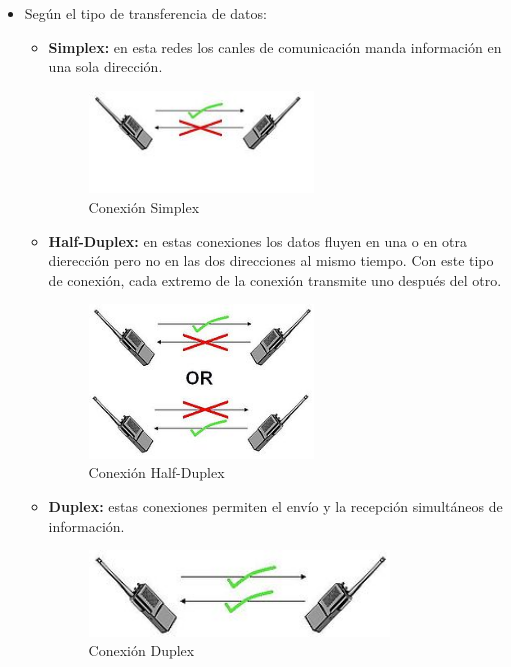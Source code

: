 \documentclass[a4paper,11pt]{article}
\begin{document}
\begin{itemize}
\item Según el tipo de transferencia de datos:
	
	\begin{itemize}
		\item \textbf{Simplex:}  en esta redes los canles de comunicación manda información en una sola dirección.
		
		\begin{figure}[h]
			\centering
			\includegraphics[scale=1,width=0.6\textwidth]{simplex.jpg}
			\caption{Conexión Simplex}
		\end{figure}
		
		\item \textbf{Half-Duplex:} en estas conexiones los datos fluyen en una o en otra dierección pero no en las dos direcciones al mismo tiempo. Con este tipo de conexión, cada extremo de la conexión transmite uno después del otro.
		
		\begin{figure}[h]
			\centering
			\includegraphics[scale=1,width=0.6\textwidth]{half_duplex.jpeg}
			\caption{Conexión Half-Duplex}
		\end{figure}
		
		
		\item \textbf{Duplex:} estas conexiones permiten el envío y la recepción simultáneos de información.
		
		\begin{figure}[h]
			\centering
			\includegraphics[scale=1,width=0.8\textwidth]{duplex.jpeg}
			\caption{Conexión Duplex}
		\end{figure}
	\end{itemize}
\end{itemize}
\end{document}
